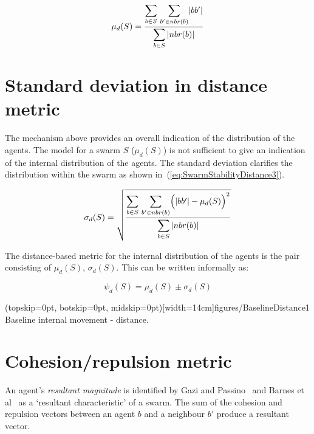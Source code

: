 \documentclass{ieeeaccess}
\begin{document}
\begin{equation}
\label{eq:SwarmStabilityDistance2}
\mu_d(S) = \frac{\mathlarger{\sum_{b \in S}}~\mathlarger{\sum_{b' \in nbr(b)}}|bb'|}{\mathlarger{\sum_{b \in S}|nbr(b)|}}
\end{equation}

\section{Standard deviation in distance metric}\label{Section:VarianceInDistance}
The mechanism above provides an overall indication of the distribution of the agents. The model for a swarm $S$ ($\mu_d(S)$) is not sufficient to give an indication of the internal distribution of the agents. The standard deviation clarifies the distribution within the swarm as shown in~(\ref{eq:SwarmStabilityDistance3}). 


\begin{equation}
\label{eq:SwarmStabilityDistance3}
\sigma_d(S) = \sqrt{\frac{\mathlarger{\sum_{b \in S}}~\mathlarger{\sum_{b' \in nbr(b)}}\Big(|bb'| - \mu_d(S)\Big)^2}{\mathlarger{\sum_{b \in S}|nbr(b)|}}}
\end{equation}

The distance-based metric for the internal distribution of the agents is the pair consisting of $\mu_d(S)$, $\sigma_d(S)$. This can be written informally as:

\begin{equation}
\label{eq:SwarmDistanceMetric}
\psi_d(S) = \mu_d(S)\pm \sigma_d(S)
\end{equation}

\Figure[t!](topskip=0pt, botskip=0pt, midskip=0pt)[width=14cm]{figures/BaselineDistance1}
{Baseline internal movement - distance.\label{coord:BaselineDistance1}}


\section{Cohesion/repulsion metric\label{section:MagnitudeDynamics}}
An agent's \emph{resultant magnitude} is identified by Gazi and Passino~\cite{GP:11} and Barnes et al~\cite{BFV:07} as a `resultant characteristic' of a swarm. The sum of the cohesion and repulsion vectors between an agent $b$ and a neighbour $b'$ produce a resultant vector.
\end{document}
